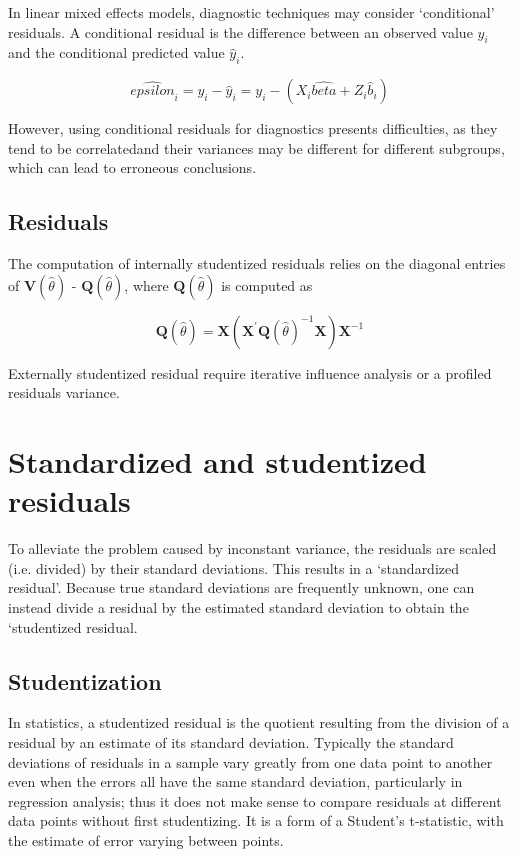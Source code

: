 \documentclass[Main.tex]{subfiles}
\begin{document}
In linear mixed effects models, diagnostic techniques may consider `conditional' residuals. A conditional residual is the difference between an observed value $y_{i}$ and the conditional predicted value $\hat{y}_{i} $.

\[ \hat{epsilon}_{i} = y_{i} - \hat{y}_{i} = y_{i} - ( X_{i}\hat{beta} + Z_{i}\hat{b}_{i}) \]

However, using conditional residuals for diagnostics presents difficulties, as they tend to be correlatedand their variances may be different for different subgroups, which can lead to erroneous conclusions.



\subsection{Residuals}

The computation of internally studentized residuals relies on the diagonal entries of
$\boldsymbol{V} (\hat{\theta})$ - $\boldsymbol{Q} (\hat{\theta})$, where $\boldsymbol{Q} (\hat{\theta})$ is computed as

\[ \boldsymbol{Q} (\hat{\theta}) = \boldsymbol{X} ( \boldsymbol{X}^{\prime}\boldsymbol{Q} (\hat{\theta})^{-1}\boldsymbol{X})\boldsymbol{X}^{-1} \]

Externally  studentized residual require iterative influence analysis or a profiled residuals variance.





\section{Standardized and studentized residuals} %

To alleviate the problem caused by inconstant variance, the residuals are scaled (i.e. divided) by their standard deviations. This results in a `standardized residual'. Because true standard deviations are frequently unknown, one can instead divide a residual by the estimated standard deviation to obtain the `studentized residual. 


\subsection{Studentization}
In statistics, a studentized residual is the quotient resulting from the division of a residual by an estimate of its standard deviation. Typically the standard deviations of residuals in a sample vary greatly from one data point to another even when the errors all have the same standard deviation, particularly in regression analysis; thus it does not make sense to compare residuals at different data points without first studentizing. It is a form of a Student's t-statistic, with the estimate of error varying between points.
\end{document}
